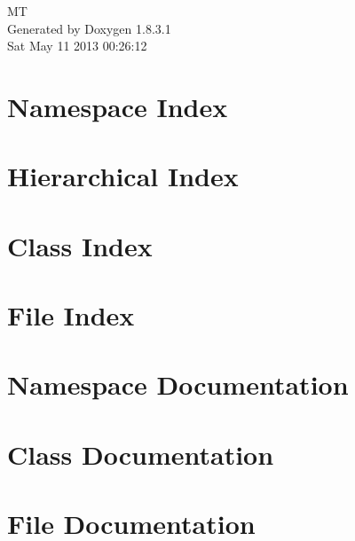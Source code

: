 \documentclass{book}
\begin{document}
\hypersetup{pageanchor=false,citecolor=blue}
\begin{titlepage}
\vspace*{7cm}
\begin{center}
{\Large M\-T }\\
\vspace*{1cm}
{\large Generated by Doxygen 1.8.3.1}\\
\vspace*{0.5cm}
{\small Sat May 11 2013 00:26:12}\\
\end{center}
\end{titlepage}
\clearemptydoublepage
{}
\tableofcontents
\clearemptydoublepage
{}
\hypersetup{pageanchor=true,citecolor=blue}
\chapter{Namespace Index}

\chapter{Hierarchical Index}

\chapter{Class Index}

\chapter{File Index}

\chapter{Namespace Documentation}

\chapter{Class Documentation}









\chapter{File Documentation}














\printindex
\end{document}
